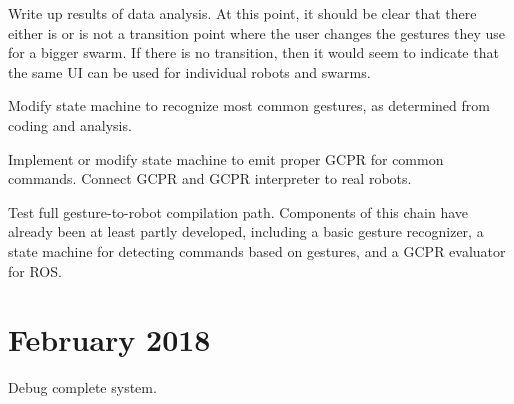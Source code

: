 
Write up results of data analysis.
At this point, it should be clear that there either is or is not a transition point where the user changes the gestures they use for a bigger swarm. 
If there is no transition, then it would seem to indicate that the same UI can be used for individual robots and swarms. 


Modify state machine to recognize most common gestures, as determined from coding and analysis. 


Implement or modify state machine to emit proper GCPR for common commands. 
Connect GCPR and GCPR interpreter to real robots.
 

Test full gesture-to-robot compilation path. Components of this chain have already been at least partly developed, including a basic gesture recognizer, a state machine for detecting commands based on gestures, and a GCPR evaluator for ROS.

\section{February 2018} \label{section:February_2018}


Debug complete system. 



